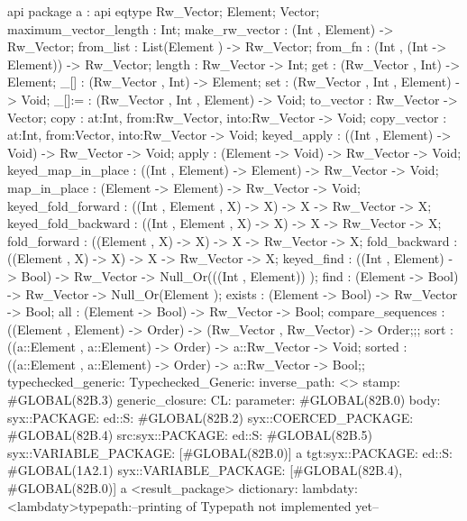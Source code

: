 api {   package a
          : api {
                eqtype Rw_Vector;
                Element;
                Vector;
                maximum_vector_length : Int;
                make_rw_vector : (Int , Element) -> Rw_Vector;
                from_list : List(Element ) -> Rw_Vector;
                from_fn : (Int , (Int -> Element)) -> Rw_Vector;
                length : Rw_Vector -> Int;
                get : (Rw_Vector , Int) -> Element;
                _[] : (Rw_Vector , Int) -> Element;
                set : (Rw_Vector , Int , Element) -> Void;
                _[]:= : (Rw_Vector , Int , Element) -> Void;
                to_vector : Rw_Vector -> Vector;
                copy : {at:Int, from:Rw_Vector, into:Rw_Vector} -> Void;
                copy_vector : {at:Int, from:Vector, into:Rw_Vector} -> Void;
                keyed_apply : ((Int , Element) -> Void) -> Rw_Vector -> Void;
                apply : (Element -> Void) -> Rw_Vector -> Void;
                keyed_map_in_place : ((Int , Element) -> Element) -> Rw_Vector -> Void;
                map_in_place : (Element -> Element) -> Rw_Vector -> Void;
                keyed_fold_forward : ((Int , Element , X) -> X) -> X -> Rw_Vector -> X;
                keyed_fold_backward : ((Int , Element , X) -> X) -> X -> Rw_Vector -> X;
                fold_forward : ((Element , X) -> X) -> X -> Rw_Vector -> X;
                fold_backward : ((Element , X) -> X) -> X -> Rw_Vector -> X;
                keyed_find : ((Int , Element) -> Bool) -> Rw_Vector -> Null_Or(((Int , Element)) );
                find : (Element -> Bool) -> Rw_Vector -> Null_Or(Element );
                exists : (Element -> Bool) -> Rw_Vector -> Bool;
                all : (Element -> Bool) -> Rw_Vector -> Bool;
                compare_sequences : ((Element , Element) -> Order) -> (Rw_Vector , Rw_Vector) -> Order;};;
    sort : ((a::Element , a::Element) -> Order) -> a::Rw_Vector -> Void;
    sorted : ((a::Element , a::Element) -> Order) -> a::Rw_Vector -> Bool;};
typechecked_generic:
Typechecked_Generic:
inverse_path: <>
stamp: #GLOBAL(82B.3)
generic_closure:
CL:
parameter: #GLOBAL(82B.0)
body: syx::PACKAGE:
        ed::S: #GLOBAL(82B.2)
            syx::COERCED_PACKAGE:
                #GLOBAL(82B.4)
                 src:syx::PACKAGE:
                 ed::S: #GLOBAL(82B.5) syx::VARIABLE_PACKAGE: [#GLOBAL(82B.0)] a
                tgt:syx::PACKAGE:
                 ed::S: #GLOBAL(1A2.1) syx::VARIABLE_PACKAGE: [#GLOBAL(82B.4), #GLOBAL(82B.0)] a
         <result_package>
dictionary:
lambdaty:
  <lambdaty>typepath:--printing of Typepath not implemented yet--
